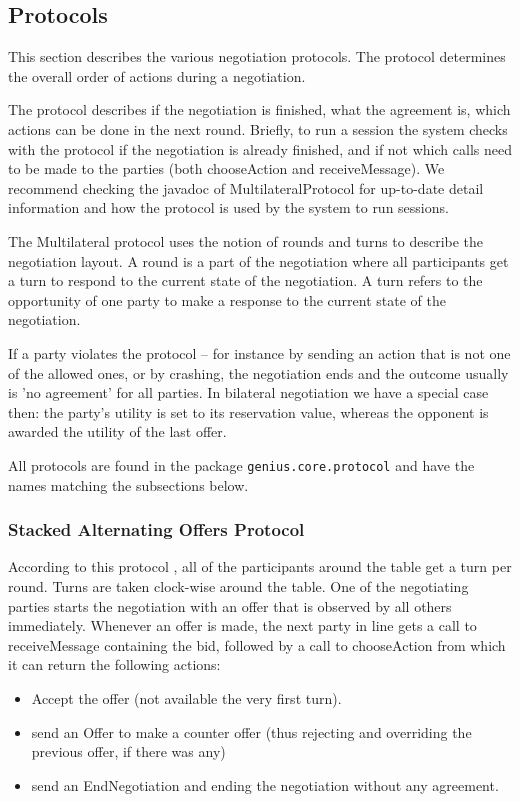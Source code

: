 \documentclass[]{llncs}
\begin{document}
\subsection{Protocols }\label{sec:protocols}
This section describes the various negotiation protocols. The protocol determines the overall order of actions during a negotiation.

The protocol describes if the negotiation is finished, what the agreement is, which actions can be done in the next round.   Briefly, to run a session the system checks with the protocol if the negotiation is already finished,  and if not which calls need to be made to the parties (both chooseAction and receiveMessage).  We recommend checking the javadoc of MultilateralProtocol for up-to-date detail information and how the protocol is used by the system to run sessions.
  
 The Multilateral protocol uses the notion of rounds and turns to describe the negotiation layout. A round is a part of the negotiation where all participants get a turn to respond to the current state of the negotiation. A turn refers to the opportunity of one party to make a response to the current state of the negotiation. 
  
If a party violates the protocol -- for instance by sending an action that is not one of the allowed ones, or by crashing, the negotiation ends and the outcome usually is 'no agreement' for all parties.  In bilateral negotiation we have a special case then: the party's utility is set to its reservation value, whereas the opponent is awarded the utility of the last offer.

All protocols are found in the package \verb|genius.core.protocol| and have the names matching the subsections below.


\subsubsection{Stacked Alternating Offers Protocol}
According to this protocol \cite{MultilateralOffersProtocols} , all of the participants around the table get a turn per round. Turns are taken clock-wise around the table. One of the negotiating parties starts the negotiation with an offer that is observed by all others immediately. Whenever an offer is made, the next party in line gets a call to receiveMessage containing the bid, followed by a call to chooseAction from which it can return the following actions:
\begin{itemize}
\item Accept the offer (not available the very first turn). 
\item send an Offer to make a counter offer (thus rejecting and overriding the previous offer, if there was any) 
\item send an EndNegotiation and ending the negotiation without any agreement.
\end{itemize}
\end{document}
